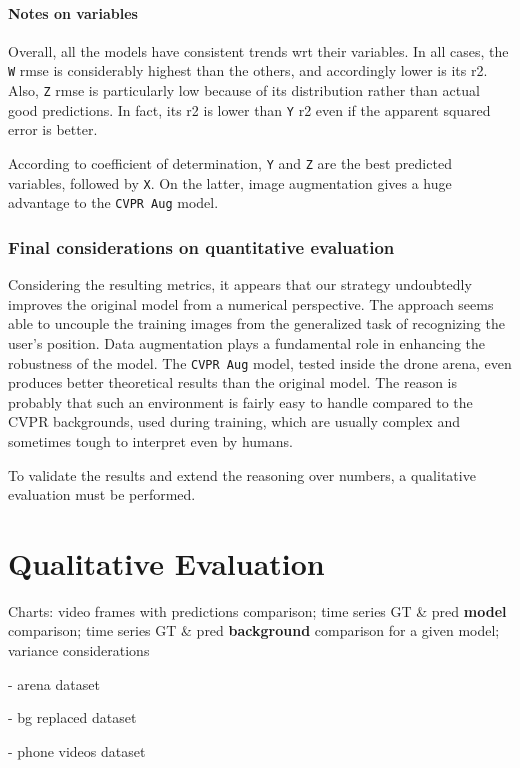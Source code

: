 \paragraph*{Notes on variables}

Overall, all the models have consistent trends \gls{wrt} their variables. In all cases, the \texttt{W} \gls{rmse} is considerably highest than the others, and accordingly lower is its \gls{r2}. Also, \texttt{Z} \gls{rmse} is particularly low because of its distribution rather than actual good predictions. In fact, its \gls{r2} is lower than \texttt{Y} \gls{r2} even if the apparent squared error is better.

According to coefficient of determination, \texttt{Y} and \texttt{Z} are the best predicted variables, followed by \texttt{X}. On the latter, image augmentation gives a huge advantage to the \texttt{CVPR Aug} model. 





\subsubsection*{Final considerations on quantitative evaluation}

Considering the resulting metrics, it appears that our strategy undoubtedly improves the original model from a numerical perspective. The approach seems able to uncouple the training images from the generalized task of recognizing the user's position. Data augmentation plays a fundamental role in enhancing the robustness of the model. The \texttt{CVPR Aug} model, tested inside the drone arena, even produces better theoretical results than the original model. The reason is probably that such an environment is fairly easy to handle compared to the CVPR backgrounds, used during training, which are usually complex and sometimes tough to interpret even by humans.

To validate the results and extend the reasoning over numbers, a qualitative evaluation must be performed.



\section{Qualitative Evaluation}
\label{sec:evaluation-qualitative}

Charts: video frames with predictions comparison; time series GT \& pred \textbf{model} comparison; time series GT \& pred \textbf{background} comparison for a given model; variance considerations

- arena dataset

- bg replaced dataset

- phone videos dataset



